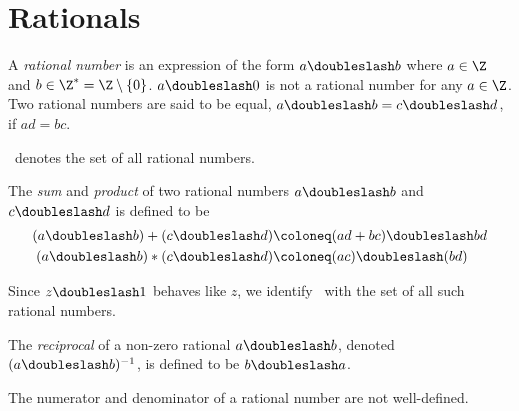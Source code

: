 \section{Rationals} \label{sec:Q}
\begin{definition}
    A \emph{rational number} is an expression of the form $a \doubleslash b$
    where $a \in \Z$ and $b \in \Z^* = \Z \setminus \{0\}$.
    $a \doubleslash 0$ is not a rational number for any $a \in \Z$.
    Two rational numbers are said to be equal,
    $a \doubleslash b = c \doubleslash d$, if $ad = bc$.

    \Q\ denotes the set of all rational numbers.
\end{definition}

\begin{definition}
    The \emph{sum} and \emph{product} of two rational numbers
    $a \doubleslash b$ and $c \doubleslash d$ is defined to be
    \begin{align*}
        (a \doubleslash b) + (c \doubleslash d)
            &\coloneq (ad + bc) \doubleslash bd \\
        (a \doubleslash b) * (c \doubleslash d)
            &\coloneq (ac) \doubleslash (bd)
    \end{align*}
\end{definition}

Since $z \doubleslash 1$ behaves like $z$, we identify \Z\ with the set of
all such rational numbers.

\begin{definition}
    The \emph{reciprocal} of a non-zero rational $a \doubleslash b$, denoted
    $(a \doubleslash b)^{-1}$, is defined to be $b \doubleslash a$.
\end{definition}
\begin{remark}
    The numerator and denominator of a rational number are not well-defined.
\end{remark}

